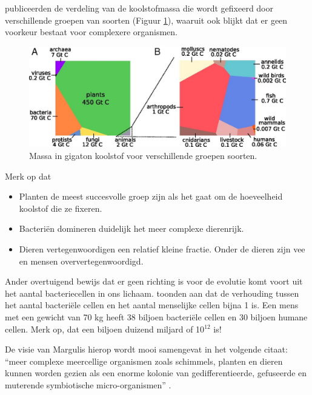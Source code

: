 \documentclass[
  11pt,
]{book}
\begin{document}
\citet{Bar-On2018} publiceerden de verdeling van de koolstofmassa die wordt gefixeerd door verschillende groepen van soorten (Figuur \ref{fig:carbonFixated}), waaruit ook blijkt dat er geen voorkeur bestaat voor complexere organismen.



\begin{figure}

{\centering \includegraphics[width=1\linewidth]{./figs/pnas.1711842115fig01} 

}

\caption{Massa in gigaton koolstof voor verschillende groepen soorten. \citep{Bar-On2018}}\label{fig:carbonFixated}
\end{figure}

Merk op dat

\begin{itemize}
\item
  Planten de meest succesvolle groep zijn als het gaat om de hoeveelheid koolstof die ze fixeren.
\item
  Bacteriën domineren duidelijk het meer complexe dierenrijk.
\item
  Dieren vertegenwoordigen een relatief kleine fractie. Onder de dieren zijn vee en mensen oververtegenwoordigd.
\end{itemize}

Ander overtuigend bewijs dat er geen richting is voor de evolutie komt voort uit het aantal bacteriecellen in ons lichaam. \citet{Sender2016} toonden aan dat de verhouding tussen het aantal bacteriële cellen en het aantal menselijke cellen bijna 1 is. Een mens met een gewicht van 70 kg heeft 38 biljoen bacteriële cellen en 30 biljoen humane cellen. Merk op, dat een biljoen duizend miljard of 10\(^{12}\) is!

De visie van Margulis hierop wordt mooi samengevat in het volgende citaat: ``meer complexe meercellige organismen zoals schimmels, planten en dieren kunnen worden gezien als een enorme kolonie van gedifferentieerde, gefuseerde en muterende symbiotische micro-organismen'' \citep{margulis1999}.
\end{document}
